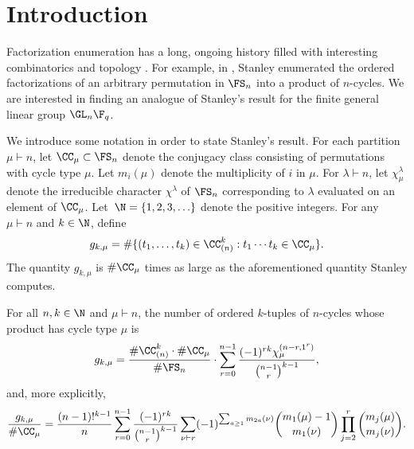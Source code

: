 \section{Introduction}


Factorization enumeration has a long, ongoing history filled with interesting combinatorics and topology \cite{bona_pittel, chapuy_stump, denes, elsv, cacti, jackson_top, vakil}.
For example, in \cite{ncycle}, Stanley enumerated the ordered factorizations of an arbitrary permutation in \(\FS_n\) into a product of \(n\)-cycles.
We are interested in finding an analogue of Stanley's result for the finite general linear group \(\GL_n \F_q\).


We introduce some notation in order to state Stanley's result.
For each partition \(\mu \vdash n\),
let \(\CC_\mu \subset \FS_n\) denote the conjugacy class consisting of permutations with cycle type \(\mu\).
Let \(m_i (\mu) \) denote the multiplicity of \(i\) in \(\mu\).
For \(\lambda \vdash n\), let \(\chi^\lambda_\mu\) denote the irreducible character \(\chi^\lambda\) of \(\FS_n\) corresponding to \(\lambda\) evaluated on an element of \(\CC_\mu\).
Let~\(\N = \{1,2,3,\ldots\}\) denote the positive integers.
For any \(\mu \vdash n\) and \(k \in \N\), define
\begin{equation}
\label{g_kmu_defn}
g_{k,\mu} = \# \{(t_1,\ldots,t_k) \in \CC_{(n)}^k : t_1\cdots t_k \in \CC_\mu\}.
\end{equation}
The quantity \(g_{k,\mu}\) is \(\#\CC_\mu\) times as large as the aforementioned quantity Stanley computes.
\begin{theorem}
\label{inspiration}
For all \(n,k \in \N\) and \(\mu \vdash n\), the number of ordered \(k\)-tuples of \(n\)-cycles whose product has cycle type \(\mu\) is
\begin{equation}
\label{chi_phrasing_of_insp}
g_{k,\mu}
=
\frac{\# \CC_{(n)}^k \cdot \#\CC_\mu}{\# \FS_n}
\cdot
\sum_{r=0}^{n-1}
\frac{(-1)^{rk} \chi^{(n-r,1^r)}_\mu}{\binom{n-1}{r}^{k-1}},
\end{equation}
and, more explicitly,
\begin{equation}
\label{explicit_phrasing_of_insp}
\frac{g_{k,\mu}}{\# \CC_\mu}
=
\frac{(n-1)!^{k-1}}{n}
\sum_{r=0}^{n-1}
\frac{(-1)^{rk}}{\binom{n-1}{r}^{k-1}}
\sum_{\nu \vdash r}
(-1)^{\sum_{a \geq 1} m_{2a}(\nu)}
\binom{m_1(\mu)-1}{m_1(\nu)}
\prod_{j = 2}^{r}
\binom{m_j(\mu)}{m_j(\nu)}.
\end{equation}
\end{theorem}


